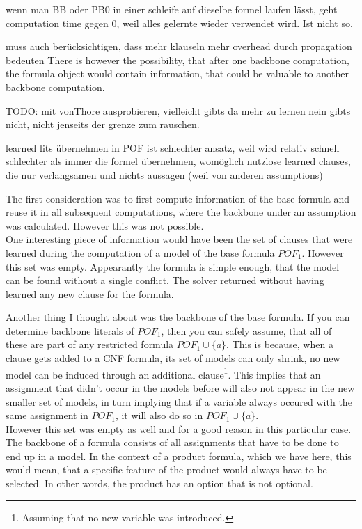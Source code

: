 wenn man BB oder PB0 in einer schleife auf dieselbe formel laufen lässt, geht computation time gegen 0, weil alles gelernte wieder verwendet wird. Ist nicht so.

muss auch berücksichtigen, dass mehr klauseln mehr overhead durch propagation bedeuten
There is however the possibility, that after one backbone computation, the formula object would contain information, that could be valuable to another backbone computation.

TODO: mit vonThore ausprobieren, vielleicht gibts da mehr zu lernen nein gibts nicht, nicht jenseits der grenze zum rauschen.








learned lits übernehmen in POF ist schlechter ansatz, weil wird relativ schnell schlechter als immer die formel übernehmen, womöglich nutzlose learned clauses, die nur verlangsamen und nichts aussagen (weil von anderen assumptions)



The first consideration was to first compute information of the base formula and reuse it in all subsequent computations, where the backbone under an assumption was calculated. However this was not possible.\\
One interesting piece of information would have been the set of clauses that were learned during the computation of a model of the base formula $POF_1$. However this set was empty. Appearantly the formula is simple enough, that the model can be found without a single conflict. The solver returned without having learned any new clause for the formula.

Another thing I thought about was the backbone of the base formula. If you can determine backbone literals of $POF_1$, then you can safely assume, that all of these are part of any restricted formula $POF_1 \cup \{a\}$. This is because, when a clause gets added to a CNF formula, its set of models can only shrink, no new model can be induced through an additional clause\footnote{Assuming that no new variable was introduced.}. This implies that an assignment that didn't occur in the models before will also not appear in the new smaller set of models, in turn implying that if a variable always occured with the same assignment in $POF_1$, it will also do so in $POF_1 \cup \{a\}$. \\
However this set was empty as well and for a good reason in this particular case. The backbone of a formula consists of all assignments that have to be done to end up in a model. In the context of a product formula, which we have here, this would mean, that a specific feature of the product would always have to be selected. In other words, the product has an option that is not optional. 

\fi
